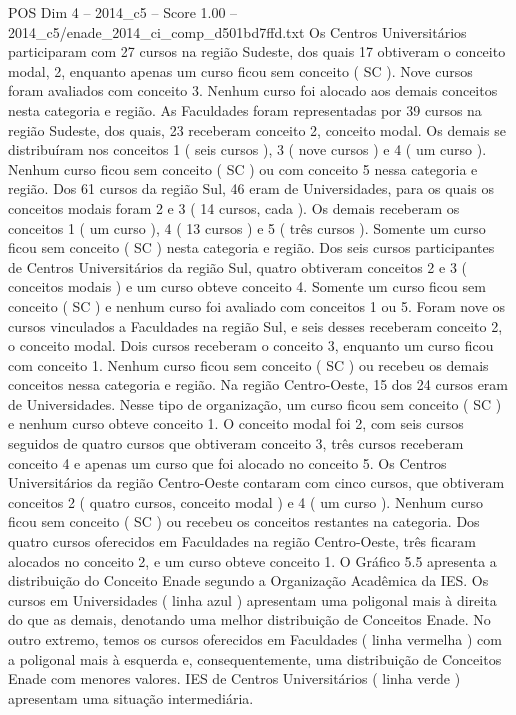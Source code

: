 \begin{textsample}{POS Dim 4 – 2014\_c5 – Score 1.00 – 2014\_c5/enade\_2014\_ci\_comp\_d501bd7ffd.txt}
Os Centros Universitários participaram com 27 cursos na região Sudeste, dos quais 17 obtiveram o conceito modal, 2, enquanto apenas um curso ficou sem conceito ( SC ).
Nove cursos foram avaliados com conceito 3.
Nenhum curso foi alocado aos demais conceitos nesta categoria e região.
As Faculdades foram representadas por 39 cursos na região Sudeste, dos quais, 23 receberam conceito 2, conceito modal.
Os demais se distribuíram nos conceitos 1 ( seis cursos ), 3 ( nove cursos ) e 4 ( um curso ).
Nenhum curso ficou sem conceito ( SC ) ou com conceito 5 nessa categoria e região.
Dos 61 cursos da região Sul, 46 eram de Universidades, para os quais os conceitos modais foram 2 e 3 ( 14 cursos, cada ).
Os demais receberam os conceitos 1 ( um curso ), 4 ( 13 cursos ) e 5 ( três cursos ).
Somente um curso ficou sem conceito ( SC ) nesta categoria e região.
Dos seis cursos participantes de Centros Universitários da região Sul, quatro obtiveram conceitos 2 e 3 ( conceitos modais ) e um curso obteve conceito 4.
Somente um curso ficou sem conceito ( SC ) e nenhum curso foi avaliado com conceitos 1 ou 5.
Foram nove os cursos vinculados a Faculdades na região Sul, e seis desses receberam conceito 2, o conceito modal.
Dois cursos receberam o conceito 3, enquanto um curso ficou com conceito 1.
Nenhum curso ficou sem conceito ( SC ) ou recebeu os demais conceitos nessa categoria e região.
Na região Centro-Oeste, 15 dos 24 cursos eram de Universidades.
Nesse tipo de organização, um curso ficou sem conceito ( SC ) e nenhum curso obteve conceito 1.
O conceito modal foi 2, com seis cursos seguidos de quatro cursos que obtiveram conceito 3, três cursos receberam conceito 4 e apenas um curso que foi alocado no conceito 5.
Os Centros Universitários da região Centro-Oeste contaram com cinco cursos, que obtiveram conceitos 2 ( quatro cursos, conceito modal ) e 4 ( um curso ).
Nenhum curso ficou sem conceito ( SC ) ou recebeu os conceitos restantes na categoria.
Dos quatro cursos oferecidos em Faculdades na região Centro-Oeste, três ficaram alocados no conceito 2, e um curso obteve conceito 1.
O Gráfico 5.5 apresenta a distribuição do Conceito Enade segundo a Organização Acadêmica da IES.
Os cursos em Universidades ( linha azul ) apresentam uma poligonal mais à direita do que as demais, denotando uma melhor distribuição de Conceitos Enade.
No outro extremo, temos os cursos oferecidos em Faculdades ( linha vermelha ) com a poligonal mais à esquerda e, consequentemente, uma distribuição de Conceitos Enade com menores valores.
IES de Centros Universitários ( linha verde ) apresentam uma situação intermediária.

\end{textsample}
